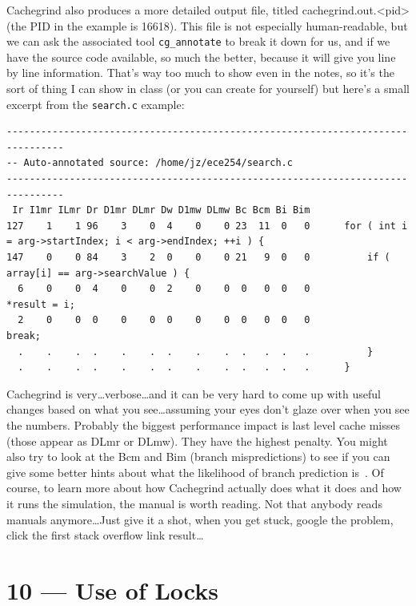 \documentclass[a4paper]{report}
\begin{document}
Cachegrind also produces a more detailed output file, titled cachegrind.out.<pid> (the PID in the example is 16618). This file is not especially human-readable, but we can ask the associated tool \texttt{cg\_annotate} to break it down for us, and if we have the source code available, so much the better, because it will give you line by line information. That's way too much to show even in the notes, so it's the sort of thing I can show in class (or you can create for yourself) but here's a small excerpt from the \texttt{search.c} example:



{\scriptsize
\begin{verbatim}
--------------------------------------------------------------------------------
-- Auto-annotated source: /home/jz/ece254/search.c
--------------------------------------------------------------------------------
 Ir I1mr ILmr Dr D1mr DLmr Dw D1mw DLmw Bc Bcm Bi Bim 
127    1    1 96    3    0  4    0    0 23  11  0   0      for ( int i = arg->startIndex; i < arg->endIndex; ++i ) {
147    0    0 84    3    2  0    0    0 21   9  0   0          if ( array[i] == arg->searchValue ) {
  6    0    0  4    0    0  2    0    0  0   0  0   0              *result = i;
  2    0    0  0    0    0  0    0    0  0   0  0   0              break;
  .    .    .  .    .    .  .    .    .  .   .  .   .          }
  .    .    .  .    .    .  .    .    .  .   .  .   .      }
\end{verbatim}
}

Cachegrind is very\ldots verbose\ldots and it can be very hard to come up with useful changes based on what you see\ldots assuming your eyes don't glaze over when you see the numbers. Probably the biggest performance impact is last level cache misses (those appear as DLmr or DLmw). They have the highest penalty. You might also try to look at the Bcm and Bim (branch mispredictions) to see if you can give some better hints about what the likelihood of branch prediction is~\cite{cachegrind}. Of course, to learn more about how Cachegrind actually does what it does and how it runs the simulation, the manual is worth reading. Not that anybody reads manuals anymore\ldots Just give it a shot, when you get stuck, google the problem, click the first stack overflow link result\ldots









\chapter*{10 --- Use of Locks}
\end{document}
